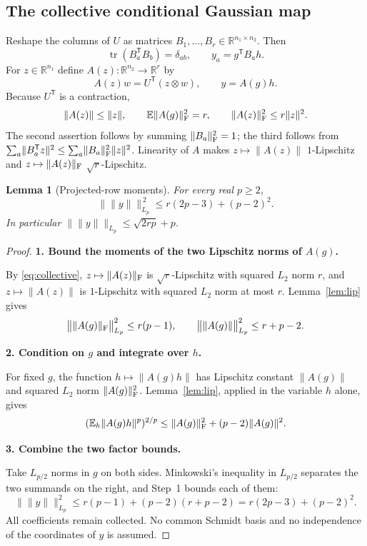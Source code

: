 \documentclass[11pt]{article}
\numberwithin{equation}{section}
\newtheorem{lemma}[theorem]{Lemma}
\theoremstyle{definition}\newtheorem{definition}[theorem]{Definition}
\theoremstyle{remark}\newtheorem{remark}[theorem]{Remark}
\newcommand{\R}{\mathbb R}\newcommand{\E}{\mathbb E}\newcommand{\Prob}{\mathbb P}
\newcommand{\tr}{\operatorname{tr}}\newcommand{\Ent}{\operatorname{Ent}}
\newcommand{\norm}[1]{\lVert#1\rVert}\newcommand{\ip}[2]{\langle#1,#2\rangle}
\newcommand{\step}[1]{\par\addvspace{.65\baselineskip}\Needspace{4\baselineskip}\noindent\textbf{#1}\par\nobreak\smallskip}
\begin{document}
\subsection{The collective conditional Gaussian map}
Reshape the columns of $U$ as matrices $B_1,\ldots,B_r\in\R^{n_1\times n_2}$.
Then
\begin{equation}\label{eq:B-orthonormal}
 \tr(B_a^{\mathsf T}B_b)=\delta_{ab},\qquad
 y_a=g^{\mathsf T}B_a h.
\end{equation}
For $z\in\R^{n_1}$ define $A(z):\R^{n_2}\to\R^r$ by
\begin{equation}\label{eq:A-map}
 A(z)w=U^{\mathsf T}(z\otimes w),\qquad y=A(g)h.
\end{equation}
Because $U^{\mathsf T}$ is a contraction,
\begin{equation}\label{eq:collective}
 \norm{A(z)}\le\norm z,\qquad
 \E\norm{A(g)}_\F^2=r,\qquad
 \norm{A(z)}_\F^2\le r\norm z^2.
\end{equation}
The second assertion follows by summing $\norm{B_a}_\F^2=1$; the third follows from
$\sum_a\norm{B_a^{\mathsf T}z}^2\le\sum_a\norm{B_a}_\F^2\norm z^2$.
Linearity of $A$ makes $z\mapsto\norm{A(z)}$ $1$-Lipschitz and
$z\mapsto\norm{A(z)}_\F$ $\sqrt r$-Lipschitz.

\begin{lemma}[Projected-row moments]\label{lem:row}
For every real $p\ge2$,
\begin{equation}\label{eq:row}
 \boxed{\bigl\|\norm y\bigr\|_{L_p}^{\,2}
 \le r(2p-3)+(p-2)^2.}
\end{equation}
In particular $\|\norm y\|_{L_p}\le\sqrt{2rp}+p$.
\end{lemma}
\begin{proof}
\step{1. Bound the moments of the two Lipschitz norms of $A(g)$.}
By \eqref{eq:collective}, $z\mapsto\norm{A(z)}_\F$ is $\sqrt r$-Lipschitz with
squared $L_2$ norm $r$, and $z\mapsto\norm{A(z)}$ is $1$-Lipschitz with squared
$L_2$ norm at most $r$. Lemma~\ref{lem:lip} gives
\[
 \bigl\|\norm{A(g)}_\F\bigr\|_{L_p}^2\le r(p-1),\qquad
 \bigl\|\norm{A(g)}\bigr\|_{L_p}^2\le r+p-2.
\]

\step{2. Condition on $g$ and integrate over $h$.}
For fixed $g$, the function $h\mapsto\norm{A(g)h}$ has Lipschitz constant
$\norm{A(g)}$ and squared $L_2$ norm $\norm{A(g)}_\F^2$. Lemma~\ref{lem:lip},
applied in the variable $h$ alone, gives
\[
 (\E_h\norm{A(g)h}^p)^{2/p}
 \le\norm{A(g)}_\F^2+(p-2)\norm{A(g)}^2.
\]

\step{3. Combine the two factor bounds.}
Take $L_{p/2}$ norms in $g$ on both sides. Minkowski's inequality in $L_{p/2}$
separates the two summands on the right, and Step~1 bounds each of them:
\[
 \bigl\|\norm y\bigr\|_{L_p}^2
 \le r(p-1)+(p-2)(r+p-2)
 =r(2p-3)+(p-2)^2.
\]
All coefficients remain collected. No common Schmidt basis and no independence of
the coordinates of $y$ is assumed.
\end{proof}
\end{document}
